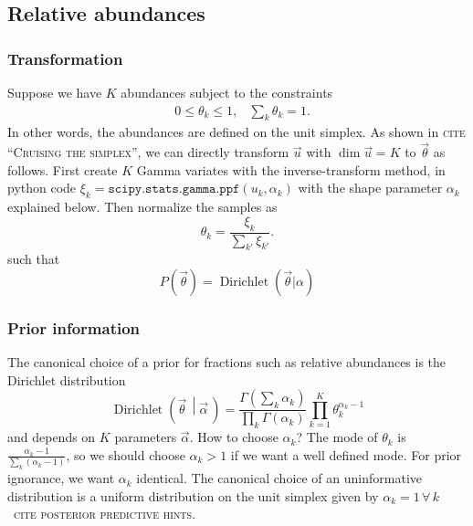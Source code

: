\documentclass[a4,12pt]{article}
\DeclareMathOperator{\Dirichlet}{Dirichlet}
\newcommand{\given}[2]{\left(#1\, \middle| #2 \, \right)}
\newcommand{\vecalpha}{\ensuremath{\vec{\alpha}}}
\newcommand{\vecth}{\ensuremath{{\vec{\theta}}}}
\newcommand{\vecu}{\ensuremath{{\vec{u}}}}
\newcommand{\todo}[1]{{\textsc{\color{red}#1}}}
\begin{document}

\subsection{Relative abundances}

\subsubsection{Transformation}

Suppose we have $K$ abundances subject to the constraints
\begin{align}
  \label{eq:unit-simplex}
  & 0 \leq \theta_k \leq 1, & \sum_{k}\theta_k = 1.
\end{align}
In other words, the abundances are defined on the unit simplex.  As
shown in \todo{cite ``Cruising the simplex''}, we can directly
transform $\vecu$ with $\dim \vecu = K$ to $\vecth$ as follows. First
create $K$ Gamma variates with the inverse-transform method, in python
code $\xi_k = \texttt{scipy.stats.gamma.ppf}(u_k, \alpha_k)$ with the
shape parameter $\alpha_k$ explained below. Then normalize the samples
as
\begin{equation}
  \label{eq:dirichlet-gamma}
  \theta_k = \frac{\xi_k}{\sum_{k'} \xi_{k'}}.
\end{equation}
such that
\begin{equation}
  \label{eq:dirichlet-prior}
  P(\vecth) = \Dirichlet(\vecth | \alpha)
\end{equation}

\subsubsection{Prior information}

The canonical choice of a prior for fractions such as relative
abundances is the Dirichlet
distribution~\cite[App.~B]{bishop_pattern_2006}
\begin{equation}
  \label{eq:dirichlet-def}
  \Dirichlet \given{\vecth}{\vecalpha} = \frac{\Gamma\left(\sum_k \alpha_k\right)}{\prod_k \Gamma(\alpha_k)} \prod_{k=1}^K \theta_k^{\alpha_k-1}
\end{equation}
and depends on $K$ parameters $\vecalpha$. How to choose $\alpha_k$?
The mode of $\theta_k$ is $\frac{\alpha_k - 1}{\sum_k (\alpha_k -
  1)}$, so we should choose $\alpha_k > 1$ if we want a well defined
mode. For prior ignorance, we want $\alpha_k$ identical. The canonical
choice of an uninformative distribution is a uniform distribution on
the unit simplex given by $\alpha_k=1 \, \forall \, k$~\todo{cite
  posterior predictive hints}.
\end{document}
